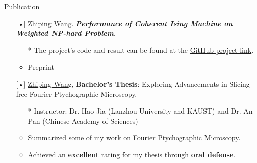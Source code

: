 \documentclass[]{kyvernitis-resume}
\begin{document}
\begin{section}{\Large Publication}
\begin{itemize}
    \item [{[•]}] \underline{Zhiping Wang}. \emph{\textbf{Performance of Coherent Ising Machine on Weighted NP-hard Problem}}.
    \begin{itemize}
    \item[*] The project's code and result can be found at the \href{https://github.com/Wang-Zhiping/Exploring-the-Performance-of-Coherent-Ising-Machine-in-weighted-NP-Hard-Problems}{GitHub project link}.
    \item Preprint
    \end{itemize}




    \item [{[•]}]
     \underline{Zhiping Wang}, \textbf{Bachelor’s Thesis}: Exploring Advancements in  Slicing-free Fourier Ptychographic Microscopy.
    \begin{itemize}
        \item[*] Instructor: Dr. Hao Jia (Lanzhou University and KAUST) and Dr. An Pan (Chinese Academy of Sciences)
        \item Summarized some of my work on Fourier Ptychographic Microscopy. 
        \item Achieved an \textbf{excellent} rating for my thesis through \textbf{oral defense}.
        \end{itemize}

\end{itemize}
\end{section}


\newpage
\end{document}

